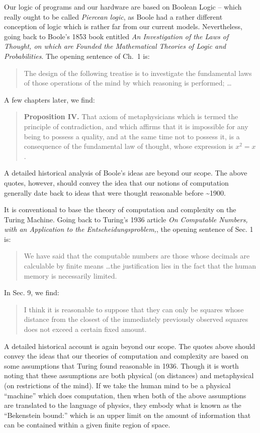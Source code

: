 \documentclass{article}
\begin{document}
Our logic of programs and our hardware are based on Boolean Logic
-- which really
ought to be called \emph{Piercean logic}, as Boole had a rather different
conception of logic which is rather far from our current models.
Nevertheless, going back
to Boole's 1853 book entitled \emph{An Investigation of the Laws of Thought,
  on which are Founded the Mathematical Theories of Logic and
  Probabilities}. The opening sentence of Ch.~1 is:
\begin{quote}
  The design of the following treatise is to investigate the fundamental laws
  of those operations of the mind by which reasoning is performed; \ldots
\end{quote}
A few chapters later, we find:
\begin{quote}
  \textbf{Proposition IV.}  That axiom of metaphysicians which is termed the
  principle of contradiction, and which affirms that it is impossible for any
  being to possess a quality, and at the same time not to possess it, is a
  consequence of the fundamental law of thought, whose expression is $x^2 =
  x$.
\end{quote}
A detailed historical analysis of Boole's ideas are beyond our scope.
The above quotes, however, should convey the idea that our notions of
computation generally date back to ideas that were thought reasonable
before \textasciitilde 1900.

It is conventional to base
the theory of computation and complexity on the Turing Machine.
Going back to Turing's 1936 article \emph{On Computable Numbers, with
  an Application to the Entscheidungsproblem,}, the opening sentence of
Sec. 1 is:
\begin{quote}
  We have said that the computable numbers are those whose decimals are
  calculable by finite means \ldots the justification lies in the fact that
  the human memory is necessarily limited.
\end{quote}
In Sec. 9, we find:
\begin{quote}
I think it is reasonable to suppose that they can only be squares
whose distance from the closest of the immediately previously observed
squares does not exceed a certain fixed amount.
\end{quote}
A detailed historical account is again beyond our scope. The quotes above
should convey the ideas that our theories
of computation and complexity are based on some assumptions that
Turing found reasonable in 1936. Though it is worth noting that these assumptions
are both physical (on distances) and metaphysical (on restrictions of the
mind).  If we take the human mind to be a physical ``machine'' which does
computation, then when both of the above assumptions are translated to the
language of physics, they embody what is known as the ``Bekenstein bound:''
which is an upper limit on the amount of information that can be contained
within a given finite region of space.
\end{document}
